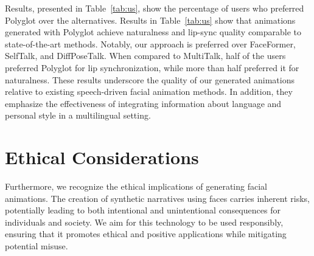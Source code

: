 \documentclass[a4paper, 10pt, conference]{ieeeconf}      %
\begin{document}
\begin{table}[ht!]
\vspace{-0.2cm}
    \centering
    \caption{User study results comparing Polyglot with state-of-the-art models. The values denote the percentages of users who favored Polyglot animations over the competitor.}%
    \label{tab:us}
    \vspace{-0.4cm}
\end{table}
Results, presented in Table~\ref{tab:us}, show the percentage of users who preferred Polyglot over the alternatives. 
Results in Table~\ref{tab:us} show that animations generated with Polyglot achieve naturalness and lip-sync quality comparable to state-of-the-art methods. Notably, our approach is preferred over FaceFormer, SelfTalk, and DiffPoseTalk. When compared to MultiTalk, half of the users preferred Polyglot for lip synchronization, while more than half preferred it for naturalness. These results underscore the quality of our generated animations relative to existing speech-driven facial animation methods. In addition, they emphasize the effectiveness of integrating information about language and personal style in a multilingual setting.
\section{Ethical Considerations}
Furthermore, we recognize the ethical implications of generating facial animations. The creation of synthetic narratives using faces carries inherent risks, potentially leading to both intentional and unintentional consequences for individuals and society. We aim for this technology to be used responsibly, ensuring that it promotes ethical and positive applications while mitigating potential misuse.
\end{document}
